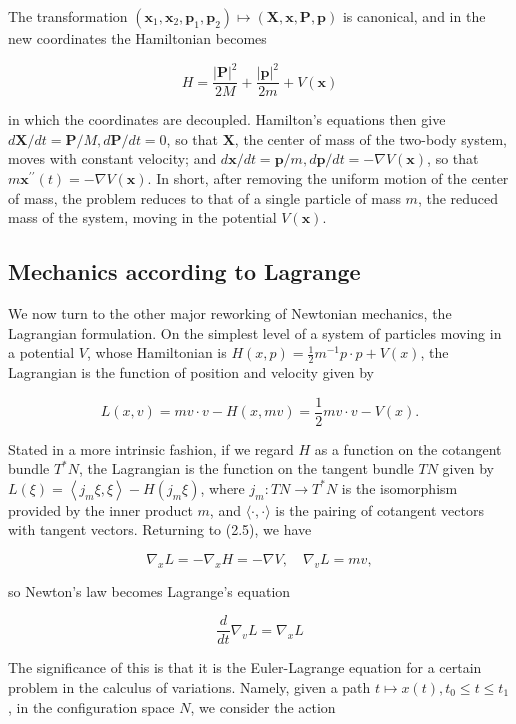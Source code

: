 \documentclass[10pt, letterpaper]{article}
\begin{document}
The transformation $\left(\mathbf{x}_{1}, \mathbf{x}_{2}, \mathbf{p}_{1}, \mathbf{p}_{2}\right) \mapsto(\mathbf{X}, \mathbf{x}, \mathbf{P}, \mathbf{p})$ is canonical, and in the new coordinates the Hamiltonian becomes

$$
H=\frac{|\mathbf{P}|^{2}}{2 M}+\frac{|\mathbf{p}|^{2}}{2 m}+V(\mathbf{x})
$$

in which the coordinates are decoupled. Hamilton's equations then give $d \mathbf{X} / d t= \mathbf{P} / M, d \mathbf{P} / d t=0$, so that $\mathbf{X}$, the center of mass of the two-body system, moves with constant velocity; and $d \mathbf{x} / d t=\mathbf{p} / m, d \mathbf{p} / d t=-\nabla V(\mathbf{x})$, so that $m \mathbf{x}^{\prime \prime}(t)=-\nabla V(\mathbf{x})$. In short, after removing the uniform motion of the center of mass, the problem reduces to that of a single particle of mass $m$, the reduced mass of the system, moving in the potential $V(\mathbf{x})$.

\subsection*{Mechanics according to Lagrange}
We now turn to the other major reworking of Newtonian mechanics, the Lagrangian formulation. On the simplest level of a system of particles moving in a potential $V$, whose Hamiltonian is $H(x, p)=\frac{1}{2} m^{-1} p \cdot p+V(x)$, the Lagrangian is the function of position and velocity given by

$$
L(x, v)=m v \cdot v-H(x, m v)=\frac{1}{2} m v \cdot v-V(x) .
$$

Stated in a more intrinsic fashion, if we regard $H$ as a function on the cotangent bundle $T^{*} N$, the Lagrangian is the function on the tangent bundle $T N$ given by $L(\xi)=\left\langle j_{m} \xi, \xi\right\rangle-H\left(j_{m} \xi\right)$, where $j_{m}: T N \rightarrow T^{*} N$ is the isomorphism provided by the inner product $m$, and $\langle\cdot, \cdot\rangle$ is the pairing of cotangent vectors with tangent vectors. Returning to (2.5), we have

$$
\nabla_{x} L=-\nabla_{x} H=-\nabla V, \quad \nabla_{v} L=m v,
$$

so Newton's law becomes Lagrange's equation

$$
\frac{d}{d t} \nabla_{v} L=\nabla_{x} L
$$

The significance of this is that it is the Euler-Lagrange equation for a certain problem in the calculus of variations. Namely, given a path $t \mapsto x(t), t_{0} \leq t \leq t_{1}$, in the configuration space $N$, we consider the action
\end{document}
